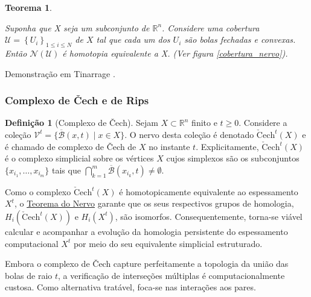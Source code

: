 \documentclass[12pt, a4paper]{article}
\theoremstyle{plain}
\newtheorem{theorem}{Teorema}[section]
\theoremstyle{definition}
\newtheorem{definition}{Definição}[section]
\theoremstyle{remark}
\newcommand{\ident}{\hspace{2em}}
\begin{document}
\begin{theorem}
    \hypertarget{teorema_nervo}{}
    Suponha que X seja um subconjunto de $\mathbb{R}^n$. Considere uma cobertura $\mathcal{U} = \left\{U_i\right\}_{1\leq i \leq N}$ de $X$ tal que cada um dos $U_i$ são bolas fechadas e convexas. Então $\mathcal{N}(\mathcal{U})$ é homotopia equivalente a X. (Ver figura \ref{cobertura_nervo}).
\end{theorem}
\vspace{-0.6em}
Demonstração em Tinarrage \cite{tinarrage2021}.

\subsubsection{Complexo de \v{C}ech e de Rips}

\begin{definition}[Complexo de \v{C}ech]
    Sejam $X \subset \mathbb{R}^n$ finito e $t \geq 0$. Considere a coleção $\mathcal{V}^t = \{\overline{\mathcal{B}}(x,t) \mid x \in X\}$. O nervo desta coleção é denotado $\check{\mathrm{C}}\mathrm{ech}^t(X)$ e é chamado de complexo de \v{C}ech de $X$ no instante $t$.
    Explicitamente, $\check{\mathrm{C}}\mathrm{ech}^t(X)$ é o complexo simplicial sobre os vértices $X$ cujos simplexos são os subconjuntos $\{x_{i_1}, \ldots, x_{i_m}\}$ tais que $\bigcap_{k=1}^{m} \overline{\mathcal{B}}(x_{i_k}, t) \neq \emptyset$.
\end{definition}

\ident Como o complexo $\check{\mathrm{C}}\mathrm{ech}^t(X)$ é homotopicamente equivalente ao espessamento $X^t$, o \hyperlink{teorema_nervo}{Teorema do Nervo} garante que os seus respectivos grupos de homologia, $H_i(\check{\mathrm{C}}\mathrm{ech}^t(X))$ e $H_i(X^t)$, são isomorfos. Consequentemente, torna-se viável calcular e acompanhar a evolução da homologia persistente do espessamento computacional $X^t$ por meio do seu equivalente simplicial estruturado.

\ident Embora o complexo de \v{C}ech capture perfeitamente a topologia da união das bolas de raio $t$, a verificação de interseções múltiplas é computacionalmente custosa. Como alternativa tratável, foca-se nas interações aos pares.
\end{document}
